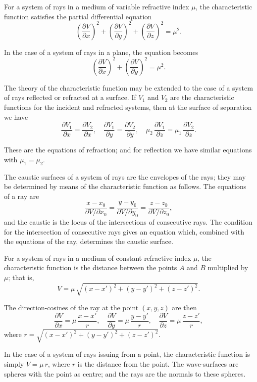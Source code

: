 \documentclass[11pt,a4paper]{book}
\begin{document}
For a system of rays in a medium of variable refractive index $\mu$, the characteristic function satisfies the partial differential equation
\[
\left(\frac{\partial V}{\partial x}\right)^{2} + \left(\frac{\partial V}{\partial y}\right)^{2} + \left(\frac{\partial V}{\partial z}\right)^{2} = \mu^{2}.
\]

In the case of a system of rays in a plane, the equation becomes
\[
\left(\frac{\partial V}{\partial x}\right)^{2} + \left(\frac{\partial V}{\partial y}\right)^{2} = \mu^{2}.
\]

\medskip\noindent
The theory of the characteristic function may be extended to the case of a system of rays reflected or refracted at a surface. If $V_{1}$ and $V_{2}$ are the characteristic functions for the incident and refracted systems, then at the surface of separation we have
\[
\frac{\partial V_{1}}{\partial x} = \frac{\partial V_{2}}{\partial x}, \quad
\frac{\partial V_{1}}{\partial y} = \frac{\partial V_{2}}{\partial y}, \quad
\mu_{2}\,\frac{\partial V_{1}}{\partial z} = \mu_{1}\,\frac{\partial V_{2}}{\partial z}.
\]

These are the equations of refraction; and for reflection we have similar equations with $\mu_{1} = \mu_{2}$.

\medskip\noindent
The caustic surfaces of a system of rays are the envelopes of the rays; they may be determined by means of the characteristic function as follows. The equations of a ray are
\[
\frac{x - x_{0}}{\partial V/\partial x_{0}} = \frac{y - y_{0}}{\partial V/\partial y_{0}} = \frac{z - z_{0}}{\partial V/\partial z_{0}},
\]
and the caustic is the locus of the intersections of consecutive rays. The condition for the intersection of consecutive rays gives an equation which, combined with the equations of the ray, determines the caustic surface.

\medskip\noindent
For a system of rays in a medium of constant refractive index $\mu$, the characteristic function is the distance between the points $A$ and $B$ multiplied by $\mu$; that is,
\[
V = \mu\,\sqrt{(x - x')^{2} + (y - y')^{2} + (z - z')^{2}}.
\]

The direction-cosines of the ray at the point $(x, y, z)$ are then
\[
\frac{\partial V}{\partial x} = \mu\,\frac{x - x'}{r}, \quad
\frac{\partial V}{\partial y} = \mu\,\frac{y - y'}{r}, \quad
\frac{\partial V}{\partial z} = \mu\,\frac{z - z'}{r},
\]
where $r = \sqrt{(x - x')^{2} + (y - y')^{2} + (z - z')^{2}}$.

\medskip\noindent
In the case of a system of rays issuing from a point, the characteristic function is simply $V = \mu\,r$, where $r$ is the distance from the point. The wave-surfaces are spheres with the point as centre; and the rays are the normals to these spheres.
\end{document}
